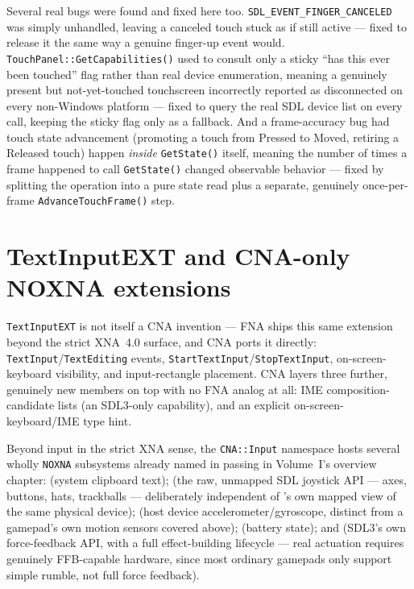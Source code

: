 Several real bugs were found and fixed here too. \texttt{SDL\_EVENT\_FINGER\_CANCELED} was
simply unhandled, leaving a canceled touch stuck as if still active --- fixed to release it
the same way a genuine finger-up event would. \texttt{TouchPanel::GetCapabilities()} used to
consult only a sticky ``has this ever been touched'' flag rather than real device
enumeration, meaning a genuinely present but not-yet-touched touchscreen incorrectly reported
as disconnected on every non-Windows platform --- fixed to query the real SDL device list on
every call, keeping the sticky flag only as a fallback. And a frame-accuracy bug had touch
state advancement (promoting a touch from Pressed to Moved, retiring a Released touch) happen
\emph{inside} \texttt{GetState()} itself, meaning the number of times a frame happened to
call \texttt{GetState()} changed observable behavior --- fixed by splitting the operation
into a pure state read plus a separate, genuinely once-per-frame
\texttt{AdvanceTouchFrame()} step.

\section{TextInputEXT and CNA-only NOXNA extensions}

\texttt{TextInputEXT} is not itself a CNA invention --- FNA ships this same extension beyond
the strict XNA~4.0 surface, and CNA ports it directly: \texttt{TextInput}/\texttt{TextEditing}
events, \texttt{StartTextInput}/\texttt{StopTextInput}, on-screen-keyboard visibility, and
input-rectangle placement. CNA layers three further, genuinely new members on top with no FNA
analog at all: IME composition-candidate lists (an SDL3-only capability), and an explicit
on-screen-keyboard/IME type hint.

Beyond input in the strict XNA sense, the \texttt{CNA::Input} namespace hosts several wholly
\texttt{NOXNA} subsystems already named in passing in Volume~I's overview chapter:
 (system clipboard text);  (the raw, unmapped SDL
joystick API --- axes, buttons, hats, trackballs --- deliberately independent of
's own mapped view of the same physical device);  (host
device accelerometer/gyroscope, distinct from a gamepad's own motion sensors covered above);
 (battery state); and  (SDL3's own force-feedback API, with
a full effect-building lifecycle --- real actuation requires genuinely FFB-capable hardware,
since most ordinary gamepads only support simple rumble, not full force feedback).

